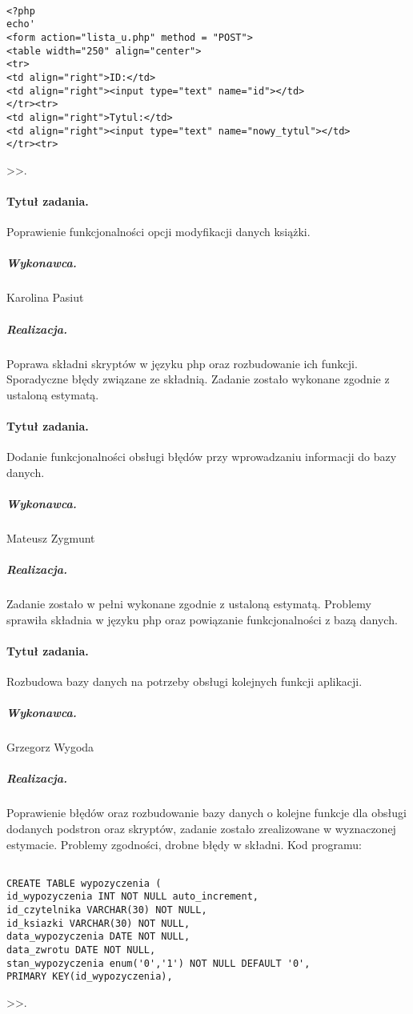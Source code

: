 \documentclass[a4paper]{article}
\begin{document}
\begin{verbatim}

<?php
echo'
<form action="lista_u.php" method = "POST">
<table width="250" align="center">
<tr>
<td align="right">ID:</td>
<td align="right"><input type="text" name="id"></td>
</tr><tr>
<td align="right">Tytul:</td>
<td align="right"><input type="text" name="nowy_tytul"></td>
</tr><tr>

\end{verbatim}>>.

\paragraph{Tytuł zadania.} Poprawienie funkcjonalności opcji modyfikacji danych książki.
\subparagraph{Wykonawca.} Karolina Pasiut
\subparagraph{Realizacja.} Poprawa składni skryptów w języku php oraz rozbudowanie ich funkcji. Sporadyczne błędy związane ze składnią. Zadanie zostało wykonane zgodnie z ustaloną estymatą.


\paragraph{Tytuł zadania.} Dodanie funkcjonalności obsługi błędów przy wprowadzaniu informacji do bazy danych.
\subparagraph{Wykonawca.} Mateusz Zygmunt
\subparagraph{Realizacja.} Zadanie zostało w pełni wykonane zgodnie z ustaloną estymatą. Problemy sprawiła składnia w języku php oraz powiązanie funkcjonalności z bazą danych.


\paragraph{Tytuł zadania.}  Rozbudowa bazy danych na potrzeby obsługi kolejnych funkcji aplikacji.
\subparagraph{Wykonawca.} Grzegorz Wygoda
\subparagraph{Realizacja.} Poprawienie błędów oraz rozbudowanie bazy danych o kolejne funkcje dla obsługi dodanych podstron oraz skryptów, zadanie zostało zrealizowane w wyznaczonej estymacie. Problemy zgodności, drobne błędy w składni. Kod programu:

\begin{verbatim}

CREATE TABLE wypozyczenia (
id_wypozyczenia INT NOT NULL auto_increment,
id_czytelnika VARCHAR(30) NOT NULL,
id_ksiazki VARCHAR(30) NOT NULL,
data_wypozyczenia DATE NOT NULL,
data_zwrotu DATE NOT NULL,
stan_wypozyczenia enum('0','1') NOT NULL DEFAULT '0',
PRIMARY KEY(id_wypozyczenia),

\end{verbatim}>>.
\end{document}
